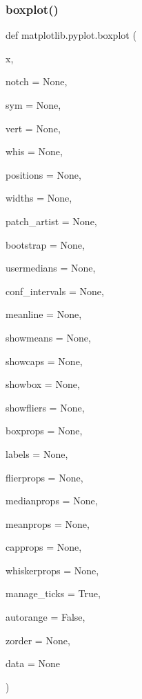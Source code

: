 \subsubsection{\texorpdfstring{boxplot()}{boxplot()}}
{\footnotesize\ttfamily def matplotlib.\+pyplot.\+boxplot (\begin{DoxyParamCaption}\item[{}]{x,  }\item[{}]{notch = {\ttfamily None},  }\item[{}]{sym = {\ttfamily None},  }\item[{}]{vert = {\ttfamily None},  }\item[{}]{whis = {\ttfamily None},  }\item[{}]{positions = {\ttfamily None},  }\item[{}]{widths = {\ttfamily None},  }\item[{}]{patch\+\_\+artist = {\ttfamily None},  }\item[{}]{bootstrap = {\ttfamily None},  }\item[{}]{usermedians = {\ttfamily None},  }\item[{}]{conf\+\_\+intervals = {\ttfamily None},  }\item[{}]{meanline = {\ttfamily None},  }\item[{}]{showmeans = {\ttfamily None},  }\item[{}]{showcaps = {\ttfamily None},  }\item[{}]{showbox = {\ttfamily None},  }\item[{}]{showfliers = {\ttfamily None},  }\item[{}]{boxprops = {\ttfamily None},  }\item[{}]{labels = {\ttfamily None},  }\item[{}]{flierprops = {\ttfamily None},  }\item[{}]{medianprops = {\ttfamily None},  }\item[{}]{meanprops = {\ttfamily None},  }\item[{}]{capprops = {\ttfamily None},  }\item[{}]{whiskerprops = {\ttfamily None},  }\item[{}]{manage\+\_\+ticks = {\ttfamily True},  }\item[{}]{autorange = {\ttfamily False},  }\item[{}]{zorder = {\ttfamily None},  }\item[{}]{data = {\ttfamily None} }\end{DoxyParamCaption})}


